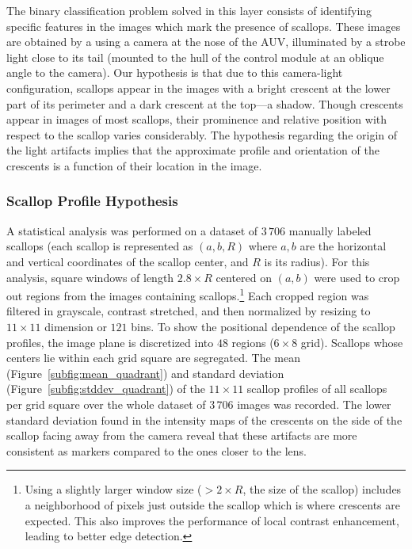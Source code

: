 \documentclass {udthesis}
\begin{document}
The binary classification problem solved in this layer consists of identifying specific features in the images which mark the presence of scallops.
These images are obtained by a using a 
camera at the nose of the AUV, illuminated by a strobe light close to its tail 
(mounted to the hull of the control module at an oblique angle to the camera).
Our hypothesis is that due to this camera-light configuration, scallops appear in the images with 
a bright crescent at the lower part of its perimeter and a dark crescent at the top---a shadow.
Though crescents appear in images of most scallops, their prominence and relative position with respect to the scallop varies considerably.
The hypothesis regarding the origin of the light artifacts implies that the approximate profile and orientation of the crescents is a function of their location in the image.



\subsubsection{Scallop Profile Hypothesis} \label{subsubsec:scallop_profile_hypothesis}

A statistical analysis was performed on  a dataset of $3\,706$ manually labeled scallops 
(each scallop is represented as $(a,b,R)$ 
where $a,b$ are the horizontal and vertical coordinates of the scallop center, 
and $R$ is its radius). 
For this analysis, square windows of length $2.8\times R$ 
centered on $(a,b)$ were used to crop out regions from the images containing scallops.\footnote{Using a slightly 
larger window size ($>2\times R$, the size of the scallop) includes
a neighborhood of pixels just outside the scallop which is where 
crescents are expected.
This also improves the performance of local contrast enhancement, leading to better edge detection.}
Each cropped region was filtered in grayscale, contrast stretched, and then normalized
by resizing to $11 \times 11$ dimension or $121$ bins.
To show the positional dependence of the scallop profiles,
the image plane is discretized into $48$ regions ($6\times8$ grid).
Scallops whose centers lie within each grid square are segregated.
The mean (Figure~\ref{subfig:mean_quadrant}) and standard deviation (Figure~\ref{subfig:stddev_quadrant}) 
of the $11 \times 11$ scallop profiles of all scallops per grid square 
over the whole dataset of $3\,706$ images was recorded.
The lower standard deviation found in the intensity maps of the crescents on the side of the scallop facing away from the camera reveal that these artifacts are more consistent as markers compared to the ones closer to the lens. 
\end{document}
